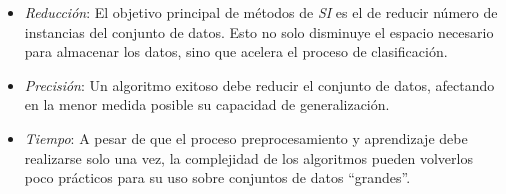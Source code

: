 \begin{itemize}
\item \emph{Reducción}: El objetivo principal de métodos de \emph{SI} es el de reducir número de instancias del conjunto de datos. Esto no solo disminuye el espacio necesario para almacenar los datos, sino que acelera el proceso de clasificación.
\item \emph{Precisión}: Un algoritmo exitoso debe reducir el conjunto de datos, afectando en la menor medida posible su capacidad de generalización.
\item \emph{Tiempo}: A pesar de que el proceso preprocesamiento y aprendizaje debe realizarse solo una vez, la complejidad de los algoritmos pueden volverlos poco prácticos para su uso sobre conjuntos de datos ``grandes''.
\end{itemize}

